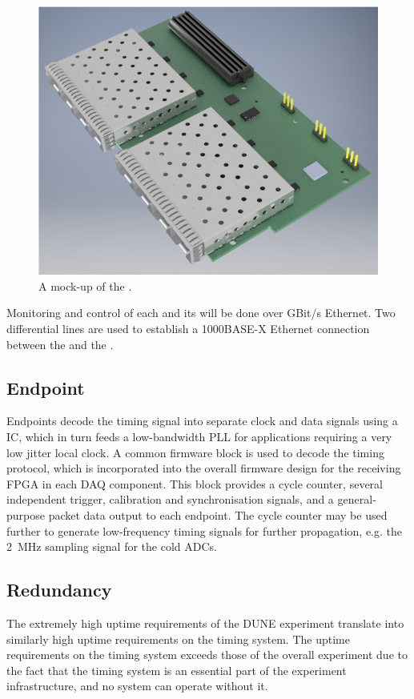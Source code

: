 \documentclass{dune}
\begin{document}
\begin{figure}[h]
\includegraphics[width=\textwidth]{fib_mockup.png}
\caption{A mock-up of the .}
\label{fig:fib_mockup}
\end{figure}

Monitoring and control of each  and its  will be done over GBit/s Ethernet. Two differential lines are used to establish a 1000BASE-X Ethernet connection between the  and the .

\subsection{Endpoint}
Endpoints decode the timing signal into separate clock and data
signals using a  IC, which in turn feeds a low-bandwidth PLL for applications requiring a very low jitter local clock. A common firmware block is used to decode the timing protocol, which is incorporated into the overall firmware design for the receiving FPGA in each DAQ component. This block provides a cycle counter, several independent trigger, calibration and synchronisation signals, and a general-purpose packet data output to each endpoint. The cycle counter may be used further to generate low-frequency timing signals for further propagation, e.g. the \SI{2}{\MHz} sampling signal for the cold ADCs.
\subsection{Redundancy}
The extremely high uptime requirements of the DUNE experiment translate into similarly high uptime requirements on the timing system. The uptime requirements on the timing system exceeds those of the overall experiment due to the fact that the timing system is an essential part of the experiment infrastructure, and no system can operate without it.
\end{document}
